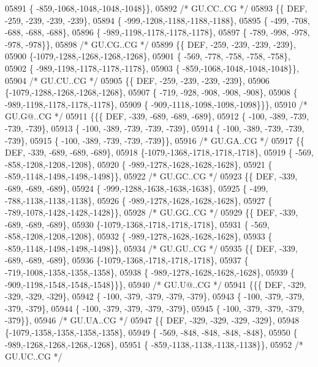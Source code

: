 \begin{DoxyCode}
05891 \{ -859,-1068,-1048,-1048,-1048\}\},
05892 \textcolor{comment}{/* GU.CC..CG */}
05893 \{\{  DEF, -259, -239, -239, -239\},
05894 \{ -999,-1208,-1188,-1188,-1188\},
05895 \{ -499, -708, -688, -688, -688\},
05896 \{ -989,-1198,-1178,-1178,-1178\},
05897 \{ -789, -998, -978, -978, -978\}\},
05898 \textcolor{comment}{/* GU.CG..CG */}
05899 \{\{  DEF, -259, -239, -239, -239\},
05900 \{-1079,-1288,-1268,-1268,-1268\},
05901 \{ -569, -778, -758, -758, -758\},
05902 \{ -989,-1198,-1178,-1178,-1178\},
05903 \{ -859,-1068,-1048,-1048,-1048\}\},
05904 \textcolor{comment}{/* GU.CU..CG */}
05905 \{\{  DEF, -259, -239, -239, -239\},
05906 \{-1079,-1288,-1268,-1268,-1268\},
05907 \{ -719, -928, -908, -908, -908\},
05908 \{ -989,-1198,-1178,-1178,-1178\},
05909 \{ -909,-1118,-1098,-1098,-1098\}\}\},
05910 \textcolor{comment}{/* GU.G@..CG */}
05911 \{\{\{  DEF, -339, -689, -689, -689\},
05912 \{ -100, -389, -739, -739, -739\},
05913 \{ -100, -389, -739, -739, -739\},
05914 \{ -100, -389, -739, -739, -739\},
05915 \{ -100, -389, -739, -739, -739\}\},
05916 \textcolor{comment}{/* GU.GA..CG */}
05917 \{\{  DEF, -339, -689, -689, -689\},
05918 \{-1079,-1368,-1718,-1718,-1718\},
05919 \{ -569, -858,-1208,-1208,-1208\},
05920 \{ -989,-1278,-1628,-1628,-1628\},
05921 \{ -859,-1148,-1498,-1498,-1498\}\},
05922 \textcolor{comment}{/* GU.GC..CG */}
05923 \{\{  DEF, -339, -689, -689, -689\},
05924 \{ -999,-1288,-1638,-1638,-1638\},
05925 \{ -499, -788,-1138,-1138,-1138\},
05926 \{ -989,-1278,-1628,-1628,-1628\},
05927 \{ -789,-1078,-1428,-1428,-1428\}\},
05928 \textcolor{comment}{/* GU.GG..CG */}
05929 \{\{  DEF, -339, -689, -689, -689\},
05930 \{-1079,-1368,-1718,-1718,-1718\},
05931 \{ -569, -858,-1208,-1208,-1208\},
05932 \{ -989,-1278,-1628,-1628,-1628\},
05933 \{ -859,-1148,-1498,-1498,-1498\}\},
05934 \textcolor{comment}{/* GU.GU..CG */}
05935 \{\{  DEF, -339, -689, -689, -689\},
05936 \{-1079,-1368,-1718,-1718,-1718\},
05937 \{ -719,-1008,-1358,-1358,-1358\},
05938 \{ -989,-1278,-1628,-1628,-1628\},
05939 \{ -909,-1198,-1548,-1548,-1548\}\}\},
05940 \textcolor{comment}{/* GU.U@..CG */}
05941 \{\{\{  DEF, -329, -329, -329, -329\},
05942 \{ -100, -379, -379, -379, -379\},
05943 \{ -100, -379, -379, -379, -379\},
05944 \{ -100, -379, -379, -379, -379\},
05945 \{ -100, -379, -379, -379, -379\}\},
05946 \textcolor{comment}{/* GU.UA..CG */}
05947 \{\{  DEF, -329, -329, -329, -329\},
05948 \{-1079,-1358,-1358,-1358,-1358\},
05949 \{ -569, -848, -848, -848, -848\},
05950 \{ -989,-1268,-1268,-1268,-1268\},
05951 \{ -859,-1138,-1138,-1138,-1138\}\},
05952 \textcolor{comment}{/* GU.UC..CG */}

\end{DoxyCode}
